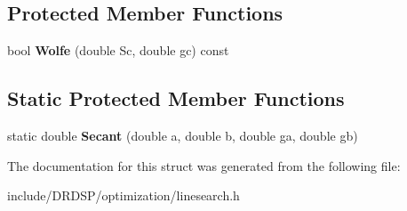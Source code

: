 \subsection*{Protected Member Functions}
\begin{DoxyCompactItemize}
\item 
\hypertarget{struct_d_r_d_s_p_1_1_line_search_af19d762879a466e39377b777f4eb15a0}{bool {\bfseries Wolfe} (double Sc, double gc) const }\label{struct_d_r_d_s_p_1_1_line_search_af19d762879a466e39377b777f4eb15a0}

\end{DoxyCompactItemize}
\subsection*{Static Protected Member Functions}
\begin{DoxyCompactItemize}
\item 
\hypertarget{struct_d_r_d_s_p_1_1_line_search_ac744fe4fb4dda7e2c71b97cf4cf162a6}{static double {\bfseries Secant} (double a, double b, double ga, double gb)}\label{struct_d_r_d_s_p_1_1_line_search_ac744fe4fb4dda7e2c71b97cf4cf162a6}

\end{DoxyCompactItemize}


The documentation for this struct was generated from the following file\-:\begin{DoxyCompactItemize}
\item 
include/\-D\-R\-D\-S\-P/optimization/linesearch.\-h\end{DoxyCompactItemize}
